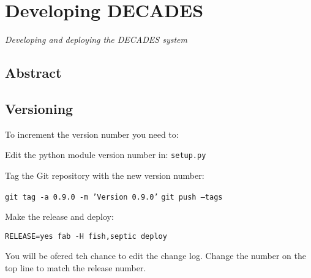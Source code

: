 

\chapter{Developing DECADES}
\begin{center}
{\small\em Developing and deploying the DECADES system}
\end{center}

\section{Abstract}

\section{Versioning}
To increment the version number you need to:

Edit the python module version number in:
{\tt setup.py}

Tag the Git repository with the new version number:

{\tt git tag -a 0.9.0 -m 'Version 0.9.0'}
{\tt git push --tags }

Make the release and deploy:

{\tt RELEASE=yes fab -H fish,septic deploy }

You will be ofered teh chance to edit the change log. Change the number on the top line to match the release number.

\newpage
